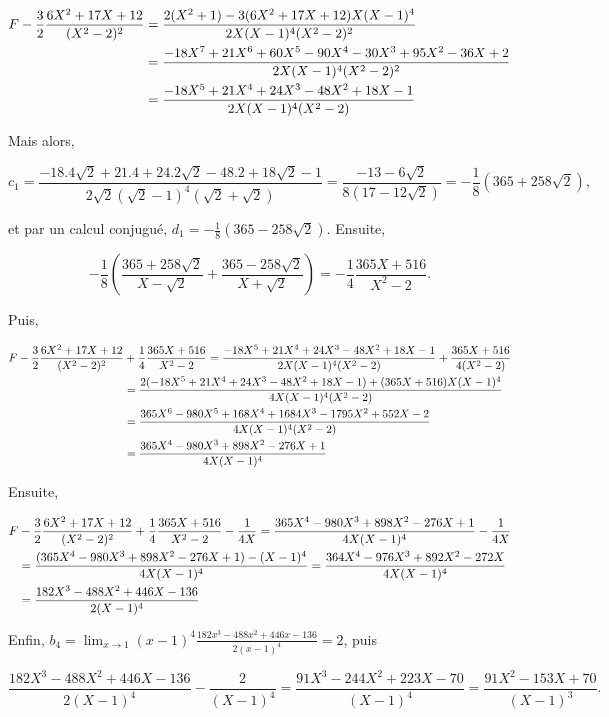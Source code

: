 {{\begin{enumerate}
\begin{align*}\ensuremath
F-\frac{3}{2}\frac{6X^2+17X+12}{(X^2-2)^2}&=\frac{2(X^2+1)-3(6X^2+17X+12)X(X-1)^4}{2X(X-1)^4(X^2-2)^2}\\
 &=\frac{-18X^7+21X^6+60X^5-90X^4-30X^3+95X^2-36X+2}{2X(X-1)^4(X^2-2)^2}\\
 &=\frac{-18X^5+21X^4+24X^3-48X^2+18X-1}{2X(X-1)^4(X^2-2)}
\end{align*}

Mais alors,

$$c_1=\frac{-18.4\sqrt{2}+21.4+24.2\sqrt{2}-48.2+18\sqrt{2}-1}{2\sqrt{2}(\sqrt{2}-1)^4(\sqrt{2}+\sqrt{2})}
=\frac{-13-6\sqrt{2}}{8(17-12\sqrt{2})}=-\frac{1}{8}(365+258\sqrt{2}),$$

et par un calcul conjugué, $d_1=-\frac{1}{8}(365-258\sqrt{2})$. Ensuite,

$$-\frac{1}{8}(\frac{365+258\sqrt{2}}{X-\sqrt{2}}+\frac{365-258\sqrt{2}}{X+\sqrt{2}})=
-\frac{1}{4}\frac{365X+516}{X^2-2}.$$

Puis,

\begin{align*}\ensuremath
F-\frac{3}{2}\frac{6X^2+17X+12}{(X^2-2)^2}&+\frac{1}{4}\frac{365X+516}{X^2-2}=
\frac{-18X^5+21X^4+24X^3-48X^2+18X-1}{2X(X-1)^4(X^2-2)}+\frac{365X+516}{4(X^2-2)}\\
 &=\frac{2(-18X^5+21X^4+24X^3-48X^2+18X-1)+(365X+516)X(X-1)^4}{4X(X-1)^4(X^2-2)}\\
 &=\frac{365X^6-980X^5+168X^4+1684X^3-1795X^2+552X-2}{4X(X-1)^4(X^2-2)}\\
 &=\frac{365X^4-980X^3+898X^2-276X+1}{4X(X-1)^4}
\end{align*}

Ensuite,

\begin{align*}\ensuremath
F&-\frac{3}{2}\frac{6X^2+17X+12}{(X^2-2)^2}+\frac{1}{4}\frac{365X+516}{X^2-2}-\frac{1}{4X}=
\frac{365X^4-980X^3+898X^2-276X+1}{4X(X-1)^4}-\frac{1}{4X}\\
 &=\frac{(365X^4-980X^3+898X^2-276X+1)-(X-1)^4}{4X(X-1)^4}=\frac{364X^4-976X^3+892X^2-272X}{4X(X-1)^4}\\
 &=\frac{182X^3-488X^2+446X-136}{2(X-1)^4}
\end{align*}

Enfin, $b_4=\lim_{x\rightarrow 1}(x-1)^4\frac{182x^3-488x^2+446x-136}{2(x-1)^4}=2$, puis

$$\frac{182X^3-488X^2+446X-136}{2(X-1)^4}-\frac{2}{(X-1)^4}=\frac{91X^3-244X^2+223X-70}{(X-1)^4}
=\frac{91X^2-153X+70}{(X-1)^3}.$$


\end{enumerate}}}
